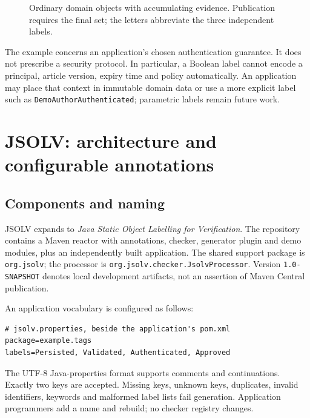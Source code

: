\documentclass[11pt]{article}
\begin{document}
\begin{figure}[ht]
\centering
{}
\caption{Ordinary domain objects with accumulating evidence. Publication requires
the final set; the letters abbreviate the three independent labels.}
\end{figure}

The example concerns an application's chosen authentication guarantee. It
does not prescribe a security protocol. In particular, a Boolean label cannot
encode a principal, article version, expiry time and policy automatically.
An application may place that context in immutable domain data or use a
more explicit label such as \texttt{DemoAuthorAuthenticated}; parametric
labels remain future work.

\section{JSOLV: architecture and configurable annotations}
\subsection{Components and naming}
JSOLV expands to \emph{Java Static Object Labelling for Verification}.
The repository contains a Maven reactor with annotations, checker, generator
plugin and demo modules, plus an independently built application. The shared
support package is \texttt{org.jsolv}; the processor is
\texttt{org.jsolv.checker.JsolvProcessor}. Version \texttt{1.0-SNAPSHOT}
denotes local development artifacts, not an assertion of Maven Central publication.

An application vocabulary is configured as follows:
\begin{lstlisting}
# jsolv.properties, beside the application's pom.xml
package=example.tags
labels=Persisted, Validated, Authenticated, Approved
\end{lstlisting}
The UTF-8 Java-properties format supports comments and continuations. Exactly
two keys are accepted. Missing keys, unknown keys, duplicates, invalid
identifiers, keywords and malformed label lists fail generation. Application
programmers add a name and rebuild; no checker registry changes.
\end{document}
